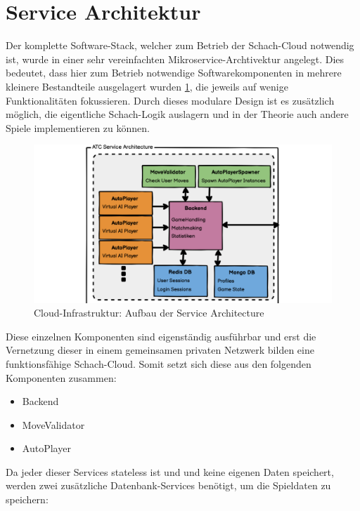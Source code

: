 \hypertarget{service-architektur}{%
\section{Service Architektur}\label{service-architektur}}

Der komplette Software-Stack, welcher zum Betrieb der Schach-Cloud
notwendig ist, wurde in einer sehr vereinfachten
Mikroservice-Archtivektur angelegt. Dies bedeutet, dass hier zum Betrieb
notwendige Softwarekomponenten in mehrere kleinere Bestandteile
ausgelagert wurden \ref{ATC_Service_Architecture}, die jeweils auf
wenige Funktionalitäten fokussieren. Durch dieses modulare Design ist es
zusätzlich möglich, die eigentliche Schach-Logik auslagern und in der
Theorie auch andere Spiele implementieren zu können.

\begin{figure}
\centering
\includegraphics{images/ATC_Service_Architecture.png}
\caption{Cloud-Infrastruktur: Aufbau der Service Architecture
\label{ATC_Service_Architecture}}
\end{figure}

Diese einzelnen Komponenten sind eigenständig ausführbar und erst die
Vernetzung dieser in einem gemeinsamen privaten Netzwerk bilden eine
funktionsfähige Schach-Cloud. Somit setzt sich diese aus den folgenden
Komponenten zusammen:

\begin{itemize}
\tightlist
\item
  Backend
\item
  MoveValidator
\item
  AutoPlayer
\end{itemize}

Da jeder dieser Services stateless ist und und keine eigenen Daten
speichert, werden zwei zusätzliche Datenbank-Services benötigt, um die
Spieldaten zu speichern:

